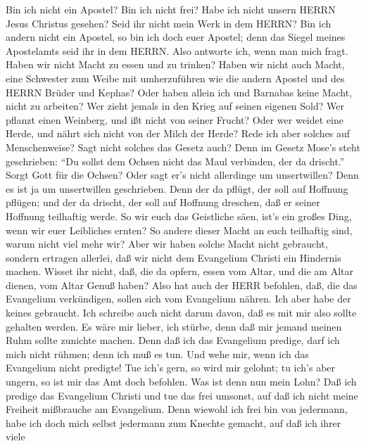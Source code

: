  Bin ich nicht ein Apostel? Bin ich nicht frei? Habe ich
nicht unsern HERRN Jesus Christus gesehen? Seid ihr nicht mein Werk in
dem HERRN?  Bin ich andern nicht ein Apostel, so bin ich
doch euer Apostel; denn das Siegel meines Apostelamts seid ihr in dem
HERRN.  Also antworte ich, wenn man mich fragt. 
Haben wir nicht Macht zu essen und zu trinken?  Haben wir
nicht auch Macht, eine Schwester zum Weibe mit umherzuführen wie die
andern Apostel und des HERRN Brüder und Kephas?  Oder haben
allein ich und Barnabas keine Macht, nicht zu arbeiten?  Wer
zieht jemals in den Krieg auf seinen eigenen Sold? Wer pflanzt einen
Weinberg, und ißt nicht von seiner Frucht? Oder wer weidet eine Herde,
und nährt sich nicht von der Milch der Herde?  Rede ich aber
solches auf Menschenweise? Sagt nicht solches das Gesetz auch?
 Denn im Gesetz Mose's steht geschrieben: ``Du sollst dem
Ochsen nicht das Maul verbinden, der da drischt.'' Sorgt Gott für die
Ochsen?  Oder sagt er's nicht allerdinge um unsertwillen?
Denn es ist ja um unsertwillen geschrieben. Denn der da pflügt, der soll
auf Hoffnung pflügen; und der da drischt, der soll auf Hoffnung
dreschen, daß er seiner Hoffnung teilhaftig werde.  So wir
euch das Geistliche säen, ist's ein großes Ding, wenn wir euer
Leibliches ernten?  So andere dieser Macht an euch
teilhaftig sind, warum nicht viel mehr wir? Aber wir haben solche Macht
nicht gebraucht, sondern ertragen allerlei, daß wir nicht dem Evangelium
Christi ein Hindernis machen.  Wisset ihr nicht, daß, die
da opfern, essen vom Altar, und die am Altar dienen, vom Altar Genuß
haben?  Also hat auch der HERR befohlen, daß, die das
Evangelium verkündigen, sollen sich vom Evangelium nähren. 
Ich aber habe der keines gebraucht. Ich schreibe auch nicht darum davon,
daß es mit mir also sollte gehalten werden. Es wäre mir lieber, ich
stürbe, denn daß mir jemand meinen Ruhm sollte zunichte machen.
 Denn daß ich das Evangelium predige, darf ich mich nicht
rühmen; denn ich muß es tun. Und wehe mir, wenn ich das Evangelium nicht
predigte!  Tue ich's gern, so wird mir gelohnt; tu ich's
aber ungern, so ist mir das Amt doch befohlen.  Was ist
denn nun mein Lohn? Daß ich predige das Evangelium Christi und tue das
frei umsonst, auf daß ich nicht meine Freiheit mißbrauche am Evangelium.
 Denn wiewohl ich frei bin von jedermann, habe ich doch
mich selbst jedermann zum Knechte gemacht, auf daß ich ihrer viele
